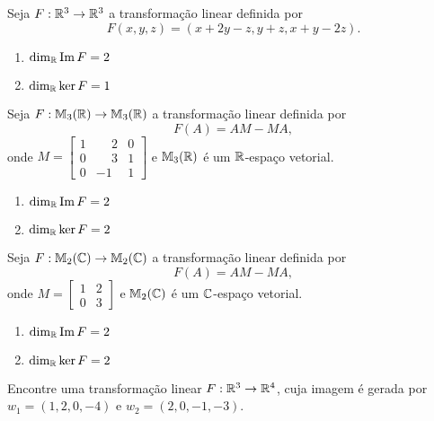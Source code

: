\documentclass[12pt]{exam}
\begin{document}
\begin{exercicio}
	Seja $F : \mathbb{R}^3 \to \mathbb{R}^3$ a transforma\c{c}\~ao linear definida por
	\[
	F(x,y,z) = (x + 2y - z, y + z, x + y - 2z).
	\]
	\begin{solucao}
		\begin{enumerate}[label=({\alph*})]
			\item $\dim_{\mathbb{R}}{\rm Im\,} F = 2$
			\item $\dim_{\mathbb{R}}\ker F = 1$
		\end{enumerate}
	\end{solucao}
\end{exercicio}

\begin{exercicio}
	Seja $F : \mathbb{M}_3(\mathbb{R}) \to \mathbb{M}_3(\mathbb{R})$ a transforma\c{c}\~ao linear definida por
	\[
	F(A) = AM - MA,
	\]
	onde $M = \begin{bmatrix}
		1 & \phantom{-}2 & 0\\0 & \phantom{-}3 & 1\\0 & -1 & 1
	\end{bmatrix}$ e $\mathbb{M}_3(\mathbb{R})$ \'e um $\mathbb{R}$-espa\c{c}o vetorial.
	\begin{solucao}
		\begin{enumerate}[label=({\alph*})]
			\item $\dim_{\mathbb{R}}{\rm Im\,} F = 2$
			\item $\dim_{\mathbb{R}}\ker F = 2$
		\end{enumerate}
	\end{solucao}
\end{exercicio}

\begin{exercicio}\label{nucleo_imagem_fim}
	Seja $F : \mathbb{M}_2(\mathbb{C}) \to \mathbb{M}_2(\mathbb{C})$ a transforma\c{c}\~ao linear definida por
	\[
	F(A) = AM - MA,
	\]
	onde $M = \begin{bmatrix}
		1 & 2\\0 & 3
	\end{bmatrix}$ e $\mathbb{M}_2(\mathbb{C})$ \'e um $\mathbb{C}$-espa\c{c}o vetorial.
	\begin{solucao}
		\begin{enumerate}[label=({\alph*})]
			\item $\dim_{\mathbb{R}}{\rm Im\,} F = 2$
			\item $\dim_{\mathbb{R}}\ker F = 2$
		\end{enumerate}
	\end{solucao}
\end{exercicio}


\begin{exercicio}
	Encontre uma transforma\c{c}\~ao linear $F : \mathbb{R}^3 \to \mathbb{R}^4$, cuja imagem \'e gerada por $w_1 = (1,2,0,-4)$ e $w_2 = (2,0,-1,-3)$.
\end{exercicio}
\end{document}
